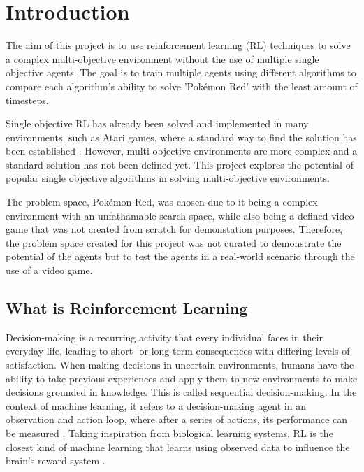 \section{Introduction}

The aim of this project is to use reinforcement learning (RL) techniques to solve a complex multi-objective environment without the use of multiple single objective agents. The goal is to train multiple agents using different algorithms to compare each algorithm's ability to solve 'Pokémon Red' with the least amount of timesteps. 

Single objective RL has already been solved and implemented in many environments, such as Atari games, where a standard way to find the solution has been established \cite{brockman2016openai}. However, multi-objective environments are more complex and a standard solution has not been defined yet. This project explores the potential of popular single objective algorithms in solving multi-objective environments.

The problem space, Pokémon Red, was chosen due to it being a complex environment with an unfathamable search space, while also being a defined video game that was not created from scratch for demonstation purposes. Therefore, the problem space created for this project was not curated to demonstrate the potential of the agents but to test the agents in a real-world scenario through the use of a video game.

\subsection{What is Reinforcement Learning}

Decision-making is a recurring activity that every individual faces in their everyday life, leading to short- or long-term consequences with differing levels of satisfaction. When making decisions in uncertain environments, humans have the ability to take previous experiences and apply them to new environments to make decisions grounded in knowledge. This is called sequential decision-making. In the context of machine learning, it refers to a decision-making agent in an observation and action loop, where after a series of actions, its performance can be measured \cite{francon2020effective}. Taking inspiration from biological learning systems, RL is the closest kind of machine learning that learns using observed data to influence the brain's reward system \cite{Sutton1}. 


